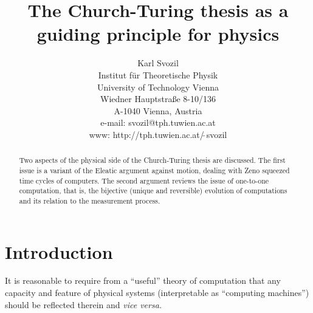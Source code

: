 
\title{The {C}hurch-{T}uring thesis as a guiding principle for
physics}
\author{Karl Svozil\\
Institut f\"ur Theoretische Physik  \\
University of Technology Vienna      \\
Wiedner Hauptstra\ss e 8-10/136    \\
A-1040 Vienna, Austria              \\
e-mail: svozil@tph.tuwien.ac.at\\
www: http://tph.tuwien.ac.at/$\widetilde{\;}$svozil}
\date{ }
\maketitle


\begin{abstract}
Two aspects of the physical side of the Church-Turing
thesis are discussed.
The first issue is a variant of the Eleatic argument against motion,
dealing with Zeno squeezed time cycles of computers.
The second argument reviews the issue of one-to-one computation, that
is, the bijective (unique and reversible) evolution of computations and
its relation to the measurement process.
\end{abstract}


\section{Introduction}
It is reasonable to require
from a ``useful'' theory of computation that any
capacity and feature of physical systems (interpretable as ``computing
machines'') should be reflected therein and
{\it vice versa.}

